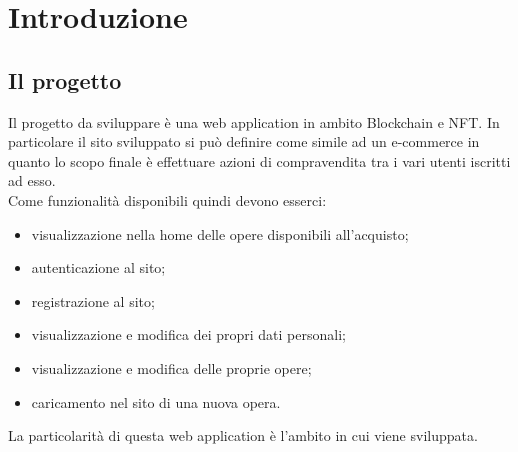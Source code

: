 \chapter{Introduzione}

\section{Il progetto}

Il progetto da sviluppare è una web application in ambito Blockchain e NFT. In particolare il sito sviluppato si può definire come simile ad un e-commerce in quanto lo scopo finale è effettuare azioni di compravendita tra i vari utenti iscritti ad esso.\\
Come funzionalità disponibili quindi devono esserci:
\begin{itemize}
	\item visualizzazione nella home delle opere disponibili all'acquisto;
	\item autenticazione al sito;
	\item registrazione al sito;
	\item visualizzazione e modifica dei propri dati personali;
	\item visualizzazione e modifica delle proprie opere;
	\item caricamento nel sito di una nuova opera.
\end{itemize}
La particolarità di questa web application è l'ambito in cui viene sviluppata.